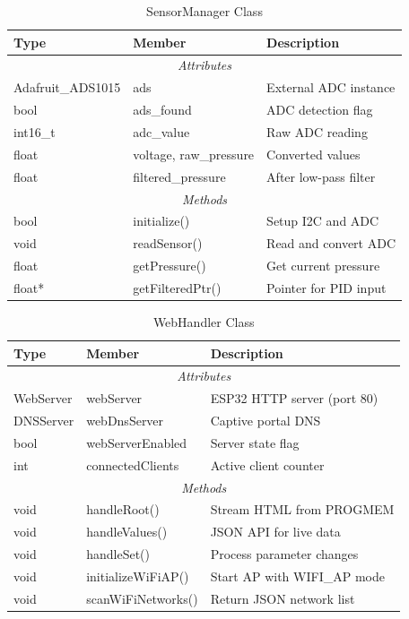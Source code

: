 \documentclass[12pt,a4paper]{article}
\begin{document}
\begin{table}[H]
\centering
\caption{SensorManager Class}
\label{tab:sensor-manager}
\begin{tabular}{|l|l|p{6cm}|}
\hline
\textbf{Type} & \textbf{Member} & \textbf{Description} \\
\hline
\multicolumn{3}{|c|}{\textit{Attributes}} \\
\hline
Adafruit\_ADS1015 & ads & External ADC instance \\
bool & ads\_found & ADC detection flag \\
int16\_t & adc\_value & Raw ADC reading \\
float & voltage, raw\_pressure & Converted values \\
float & filtered\_pressure & After low-pass filter \\
\hline
\multicolumn{3}{|c|}{\textit{Methods}} \\
\hline
bool & initialize() & Setup I2C and ADC \\
void & readSensor() & Read and convert ADC \\
float & getPressure() & Get current pressure \\
float* & getFilteredPtr() & Pointer for PID input \\
\hline
\end{tabular}
\end{table}

\begin{table}[H]
\centering
\caption{WebHandler Class}
\label{tab:web-handler}
\begin{tabular}{|l|l|p{6cm}|}
\hline
\textbf{Type} & \textbf{Member} & \textbf{Description} \\
\hline
\multicolumn{3}{|c|}{\textit{Attributes}} \\
\hline
WebServer & webServer & ESP32 HTTP server (port 80) \\
DNSServer & webDnsServer & Captive portal DNS \\
bool & webServerEnabled & Server state flag \\
int & connectedClients & Active client counter \\
\hline
\multicolumn{3}{|c|}{\textit{Methods}} \\
\hline
void & handleRoot() & Stream HTML from PROGMEM \\
void & handleValues() & JSON API for live data \\
void & handleSet() & Process parameter changes \\
void & initializeWiFiAP() & Start AP with WIFI\_AP mode \\
void & scanWiFiNetworks() & Return JSON network list \\
\hline
\end{tabular}
\end{table}
\end{document}
